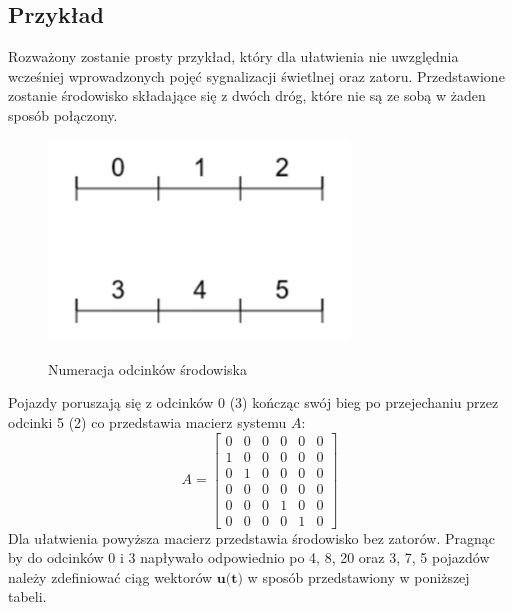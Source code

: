 \documentclass[12pt]{book}
\theoremstyle{plain}
\begin{document}
\subsection*{Przykład}
Rozważony zostanie prosty przykład, który dla ułatwienia nie uwzględnia wcześniej wprowadzonych pojęć sygnalizacji świetlnej oraz zatoru. Przedstawione zostanie środowisko składające się z dwóch dróg, które nie są ze sobą w żaden sposób połączony.
\begin{figure}[H]
	\centering
	\includegraphics[width=8cm]{images/env_12}
	\label{fig:env_12}
	\caption{Numeracja odcinków środowiska}
\end{figure} \noindent
Pojazdy poruszają się z odcinków 0 (3) kończąc swój bieg po przejechaniu przez odcinki 5 (2) co przedstawia macierz systemu $A$:
\def \A{\begin{bmatrix}
0 & 0 & 0 & 0 & 0 & 0 \\
1 & 0 & 0 & 0 & 0 & 0 \\
0 & 1 & 0 & 0 & 0 & 0 \\
0 & 0 & 0 & 0 & 0 & 0 \\
0 & 0 & 0 & 1 & 0 & 0 \\
0 & 0 & 0 & 0 & 1 & 0
\end{bmatrix}}
\[A=\A \]
Dla ułatwienia powyższa macierz przedstawia środowisko bez zatorów.
Pragnąc by do odcinków 0 i 3  napływało odpowiednio po 4, 8, 20 oraz 3, 7, 5 pojazdów należy zdefiniować ciąg wektorów $\textbf{u(t)}$ w sposób przedstawiony w poniższej tabeli. \newline
\end{document}
